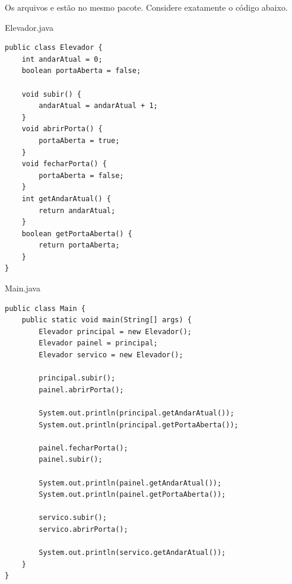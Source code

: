 \documentclass[11pt,a4paper]{article}
\begin{document}
\cabecalhoAvaliacao
\blocoQuadroRespostas
{}
Os arquivos  e  estão no mesmo pacote.
Considere exatamente o código abaixo.

\noindent\begin{minipage}[t]{.37\textwidth}
\vspace{0pt}
\begin{painelreferencia}{Elevador.java}
\begin{lstlisting}[style=cenariocodigo]
public class Elevador {
    int andarAtual = 0;
    boolean portaAberta = false;

    void subir() {
        andarAtual = andarAtual + 1;
    }
    void abrirPorta() {
        portaAberta = true;
    }
    void fecharPorta() {
        portaAberta = false;
    }
    int getAndarAtual() {
        return andarAtual;
    }
    boolean getPortaAberta() {
        return portaAberta;
    }
}
\end{lstlisting}
\end{painelreferencia}
\end{minipage}\hfill
\begin{minipage}[t]{.61\textwidth}
\vspace{0pt}
\begin{painelreferencia}{Main.java}
\begin{lstlisting}[style=cenariocodigo]
public class Main {
    public static void main(String[] args) {
        Elevador principal = new Elevador();
        Elevador painel = principal;
        Elevador servico = new Elevador();

        principal.subir();
        painel.abrirPorta();

        System.out.println(principal.getAndarAtual());
        System.out.println(principal.getPortaAberta());

        painel.fecharPorta();
        painel.subir();

        System.out.println(painel.getAndarAtual());
        System.out.println(painel.getPortaAberta());

        servico.subir();
        servico.abrirPorta();

        System.out.println(servico.getAndarAtual());
    }
}
\end{lstlisting}
\end{painelreferencia}
\end{minipage}
\inicioQuestoes

\end{document}
